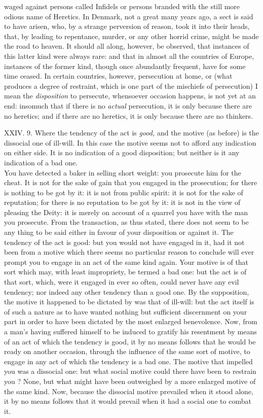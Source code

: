 \documentclass[12pt]{report}
\begin{document}
waged against persons called Infidels or persons branded with the still
more odious name of Heretics. In Denmark, not a great many years ago, a
sect is said to have arisen, who, by a strange perversion of reason,
took it into their heads, that, by leading to repentance, murder, or any
other horrid crime, might be made the road to heaven. It should all
along, however, be observed, that instances of this latter kind were
always rare: and that in almost all the countries of Europe, instances
of the former kind, though once abundantly frequent, have for some time
ceased. In certain countries, however, persecution at home, or (what
produces a degree of restraint, which is one part of the mischiefs of
persecution) I mean the \emph{disposition} to persecute, whensoever
occasion happens, is not yet at an end: insomuch that if there is no
\emph{actual} persecution, it is only because there are no heretics; and
if there are no heretics, it is only because there are no thinkers.

XXIV. 9. Where the tendency of the act is \emph{good,} and the motive
(as before) is the dissocial one of ill-will. In this case the motive
seems not to afford any indication on either side. It is no indication
of a good disposition; but neither is it any indication of a bad one.\\
You have detected a baker in selling short weight: you prosecute him for
the cheat. It is not for the sake of gain that you engaged in the
prosecution; for there is nothing to be got by it: it is not from public
spirit: it is not for the sake of reputation; for there is no reputation
to be got by it: it is not in the view of pleasing the Deity: it is
merely on account of a quarrel you have with the man you prosecute. From
the transaction, as thus stated, there does not seem to be any thing to
be said either in favour of your disposition or against it. The tendency
of the act is good: but you would not have engaged in it, had it not
been from a motive which there seems no particular reason to conclude
will ever prompt you to engage in an act of the same kind again. Your
motive is of that sort which may, with least impropriety, be termed a
bad one: but the act is of that sort, which, were it engaged in ever so
often, could never have any evil tendency; nor indeed any other tendency
than a good one. By the supposition, the motive it happened to be
dictated by was that of ill-will: but the act itself is of such a nature
as to have wanted nothing but sufficient discernment on your part in
order to have been dictated by the most enlarged benevolence. Now, from
a man's having suffered himself to be induced to gratify his resentment
by means of an act of which the tendency is good, it by no means follows
that he would be ready on another occasion, through the influence of the
same sort of motive, to engage in any act of which the tendency is a bad
one. The motive that impelled you was a dissocial one: but what social
motive could there have been to restrain you ? None, but what might have
been outweighed by a more enlarged motive of the same kind. Now, because
the dissocial motive prevailed when it stood alone, it by no means
follows that it would prevail when it had a social one to combat it.
\end{document}

